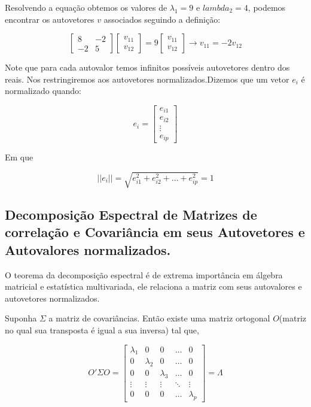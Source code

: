 \documentclass[
  letterpaper,
  DIV=11,
  numbers=noendperiod]{scrreprt}
\begin{document}
Resolvendo a equação obtemos os valores de \(\lambda_1 = 9\) e
\(lambda_2 = 4\), podemos encontrar os autovetores \(v\) associados
seguindo a definição:

\[
\begin{bmatrix}
8&-2\\
-2 & 5
\end{bmatrix}
\begin{bmatrix}
v_{11}\\
v_{12}
\end{bmatrix} = 
9\begin{bmatrix}
v_{11}\\
v_{12}
\end{bmatrix} \rightarrow v_{11} =- 2v_{12}
\]

Note que para cada autovalor temos infinitos possíveis autovetores
dentro dos reais. Nos restringiremos aos autovetores
normalizados.Dizemos que um vetor \(e_i\) é normalizado quando:

\[
e_i = \begin{bmatrix}
e_{i1}\\
e_{i2}\\
\vdots\\
e_{ip}
\end{bmatrix}
\]

Em que

\[
||e_i|| = \sqrt{e^2_{i1} + e^2_{i2} + \dots + e^2_{ip}} = 1
\]

\hypertarget{decomposiuxe7uxe3o-espectral-de-matrizes-de-correlauxe7uxe3o-e-covariuxe2ncia-em-seus-autovetores-e-autovalores-normalizados.}{%
\subsection{Decomposição Espectral de Matrizes de correlação e
Covariância em seus Autovetores e Autovalores
normalizados.}\label{decomposiuxe7uxe3o-espectral-de-matrizes-de-correlauxe7uxe3o-e-covariuxe2ncia-em-seus-autovetores-e-autovalores-normalizados.}}

O teorema da decomposição espectral é de extrema importância em álgebra
matricial e estatística multivariada, ele relaciona a matriz com seus
autovalores e autovetores normalizados.

Suponha \(\Sigma\) a matriz de covariâncias. Então existe uma matriz
ortogonal \(O\)(matriz no qual sua transposta é igual a sua inversa) tal
que,

\[
O'\Sigma O = \begin{bmatrix}
\lambda_1 & 0 & 0 &\dots & 0\\
0&\lambda_2& 0 & \dots & 0 \\
0 & 0 &\lambda_3 &\dots & 0\\
\vdots& \vdots & \vdots & \ddots & \vdots\\
0 & 0 & 0 & \dots& \lambda_p
\end{bmatrix} = \Lambda
\]
\end{document}
